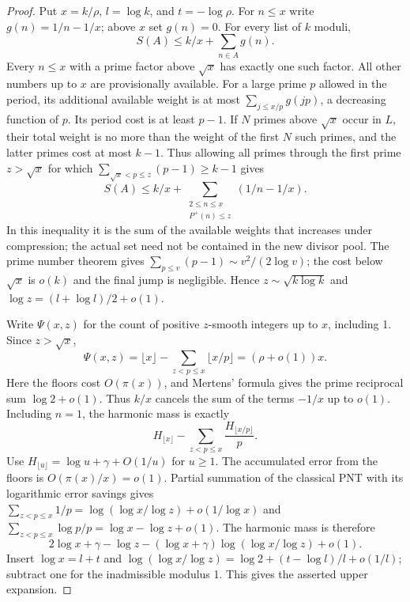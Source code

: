 \documentclass[10pt]{article}
\newcommand{\lp}{P^+}
\begin{document}
\begin{proof}
Put $x=k/\rho$, $l=\log k$, and $t=-\log\rho$. For $n\le x$ write $g(n)=1/n-1/x$; above $x$ set $g(n)=0$. For every list of $k$ moduli,
\[
 S(A)\le k/x+\sum_{n\in A}g(n).
\]
Every $n\le x$ with a prime factor above $\sqrt x$ has exactly one such factor. All other numbers up to $x$ are provisionally available. For a large prime $p$ allowed in the period, its additional available weight is at most $\sum_{j\le x/p}g(jp)$, a decreasing function of $p$. Its period cost is at least $p-1$. If $N$ primes above $\sqrt x$ occur in $L$, their total weight is no more than the weight of the first $N$ such primes, and the latter primes cost at most $k-1$. Thus allowing all primes through the first prime $z>\sqrt x$ for which $\sum_{\sqrt x<p\le z}(p-1)\ge k-1$ gives
\[
 S(A)\le k/x+\sum_{\substack{2\le n\le x\\\lp(n)\le z}}(1/n-1/x).
\]
In this inequality it is the sum of the available weights that increases under compression; the actual set need not be contained in the new divisor pool. The prime number theorem gives $\sum_{p\le v}(p-1)\sim v^2/(2\log v)$; the cost below $\sqrt x$ is $o(k)$ and the final jump is negligible. Hence $z\sim\sqrt{k\log k}$ and $\log z=(l+\log l)/2+o(1)$.

Write $\Psi(x,z)$ for the count of positive $z$-smooth integers up to $x$, including 1. Since $z>\sqrt x$,
\[
 \Psi(x,z)=\lfloor x\rfloor-\sum_{z<p\le x}\lfloor x/p\rfloor=(\rho+o(1))x.
\]
Here the floors cost $O(\pi(x))$, and Mertens' formula gives the prime reciprocal sum $\log 2+o(1)$. Thus $k/x$ cancels the sum of the terms $-1/x$ up to $o(1)$. Including $n=1$, the harmonic mass is exactly
\[
 H_{\lfloor x\rfloor}-\sum_{z<p\le x}\frac{H_{\lfloor x/p\rfloor}}p .
\]
Use $H_{\lfloor u\rfloor}=\log u+\gamma+O(1/u)$ for $u\ge1$. The accumulated error from the floors is $O(\pi(x)/x)=o(1)$. Partial summation of the classical PNT with its logarithmic error savings gives $\sum_{z<p\le x}1/p=\log(\log x/\log z)+o(1/\log x)$ and $\sum_{z<p\le x}\log p/p=\log x-\log z+o(1)$. The harmonic mass is therefore
\[
 2\log x+\gamma-\log z-(\log x+\gamma)\log(\log x/\log z)+o(1).
\]
Insert $\log x=l+t$ and $\log(\log x/\log z)=\log2+(t-\log l)/l+o(1/l)$; subtract one for the inadmissible modulus 1. This gives the asserted upper expansion.


\end{proof}
\end{document}
